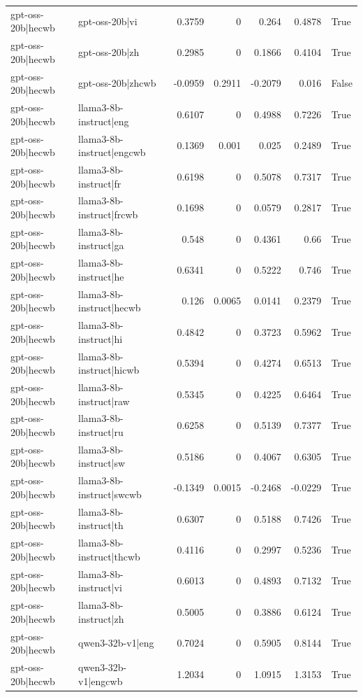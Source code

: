 \begin{table}
\begin{tabular}{l l r r r r l}
gpt-oss-20b|hecwb & gpt-oss-20b|vi & 0.3759 & 0 & 0.264 & 0.4878 & True \\
gpt-oss-20b|hecwb & gpt-oss-20b|zh & 0.2985 & 0 & 0.1866 & 0.4104 & True \\
gpt-oss-20b|hecwb & gpt-oss-20b|zhcwb & -0.0959 & 0.2911 & -0.2079 & 0.016 & False \\
gpt-oss-20b|hecwb & llama3-8b-instruct|eng & 0.6107 & 0 & 0.4988 & 0.7226 & True \\
gpt-oss-20b|hecwb & llama3-8b-instruct|engcwb & 0.1369 & 0.001 & 0.025 & 0.2489 & True \\
gpt-oss-20b|hecwb & llama3-8b-instruct|fr & 0.6198 & 0 & 0.5078 & 0.7317 & True \\
gpt-oss-20b|hecwb & llama3-8b-instruct|frcwb & 0.1698 & 0 & 0.0579 & 0.2817 & True \\
gpt-oss-20b|hecwb & llama3-8b-instruct|ga & 0.548 & 0 & 0.4361 & 0.66 & True \\
gpt-oss-20b|hecwb & llama3-8b-instruct|he & 0.6341 & 0 & 0.5222 & 0.746 & True \\
gpt-oss-20b|hecwb & llama3-8b-instruct|hecwb & 0.126 & 0.0065 & 0.0141 & 0.2379 & True \\
gpt-oss-20b|hecwb & llama3-8b-instruct|hi & 0.4842 & 0 & 0.3723 & 0.5962 & True \\
gpt-oss-20b|hecwb & llama3-8b-instruct|hicwb & 0.5394 & 0 & 0.4274 & 0.6513 & True \\
gpt-oss-20b|hecwb & llama3-8b-instruct|raw & 0.5345 & 0 & 0.4225 & 0.6464 & True \\
gpt-oss-20b|hecwb & llama3-8b-instruct|ru & 0.6258 & 0 & 0.5139 & 0.7377 & True \\
gpt-oss-20b|hecwb & llama3-8b-instruct|sw & 0.5186 & 0 & 0.4067 & 0.6305 & True \\
gpt-oss-20b|hecwb & llama3-8b-instruct|swcwb & -0.1349 & 0.0015 & -0.2468 & -0.0229 & True \\
gpt-oss-20b|hecwb & llama3-8b-instruct|th & 0.6307 & 0 & 0.5188 & 0.7426 & True \\
gpt-oss-20b|hecwb & llama3-8b-instruct|thcwb & 0.4116 & 0 & 0.2997 & 0.5236 & True \\
gpt-oss-20b|hecwb & llama3-8b-instruct|vi & 0.6013 & 0 & 0.4893 & 0.7132 & True \\
gpt-oss-20b|hecwb & llama3-8b-instruct|zh & 0.5005 & 0 & 0.3886 & 0.6124 & True \\
gpt-oss-20b|hecwb & qwen3-32b-v1|eng & 0.7024 & 0 & 0.5905 & 0.8144 & True \\
gpt-oss-20b|hecwb & qwen3-32b-v1|engcwb & 1.2034 & 0 & 1.0915 & 1.3153 & True \\

\end{tabular}
\end{table}
